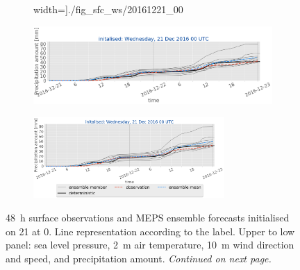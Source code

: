 \begin{figure}[H]
\begin{subfigure}[b]{0.75\textwidth}
		width=\textwidth]{./fig_sfc_ws/20161221_00}
		\caption{}\label{fig:res:sfc_ws21}
	\end{subfigure}
	\begin{subfigure}[b]{0.75\textwidth}
		\includegraphics[trim={0.cm 1.5cm 0cm 0cm},clip,
		width=\textwidth]{./fig_sfc_precip/20161221_00}
		\caption{}\label{fig:res:sfc_precip21}
	\end{subfigure}
	\begin{subfigure}[b]{0.8\textwidth}
		\centering
		\includegraphics[trim={5.5cm 0cm 5.cm 17.7cm},clip,
		width=0.8\textwidth]{./fig_sfc_precip/20161221_00_label}
	\end{subfigure}
    \caption{\SI{48}{\hour} surface observations and MEPS ensemble forecasts initialised on \SI{21}{\dec} at \SI{0}{\UTC}. 
Line representation according to the label. Upper to low panel: sea level pressure, \SI{2}{\metre} air temperature, \SI{10}{\metre} wind direction and speed, and precipitation amount. \textit{Continued on next page.}}\label{fig:res:sfc_obs_meps}
\end{figure}
